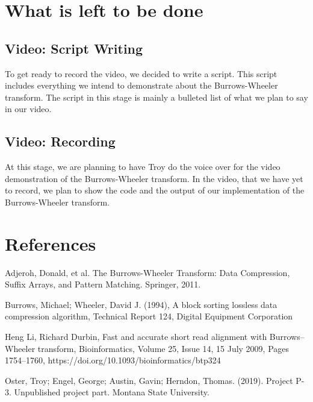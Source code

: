 \documentclass{article}
\begin{document}
   \section{What is left to be done}
   
   \subsection{Video: Script Writing}
   To get ready to record the video, we decided to write a script. This script includes everything we intend to demonstrate about the Burrows-Wheeler transform. The script in this stage is mainly a bulleted list of what we plan to say in our video.
   
   \subsection{Video: Recording}
   At this stage, we are planning to have Troy do the voice over for the video demonstration of the Burrows-Wheeler transform. In the video, that we have yet to record, we plan to show the code and the output of our implementation of the Burrows-Wheeler transform.
   
      \section{References}
   \newline \makebox[.5cm]{[1]} Adjeroh, Donald, et al. The Burrows-Wheeler Transform: Data Compression, Suffix Arrays, and Pattern Matching. Springer, 2011.\par
    \makebox[.5cm]{[2]}  Burrows, Michael; Wheeler, David J. (1994), A block sorting lossless data compression algorithm, Technical Report 124, Digital Equipment Corporation\par
    \makebox[.5cm]{[3]} Heng Li, Richard Durbin, Fast and accurate short read alignment with Burrows–Wheeler transform, Bioinformatics, Volume 25, Issue 14, 15 July 2009, Pages 1754–1760, https://doi.org/10.1093/bioinformatics/btp324\par
    \makebox[.5cm]{[4]} Oster, Troy; Engel, George; Austin, Gavin; Herndon, Thomas. (2019). Project P-3. Unpublished project part. Montana State University.\par
\end{document}

